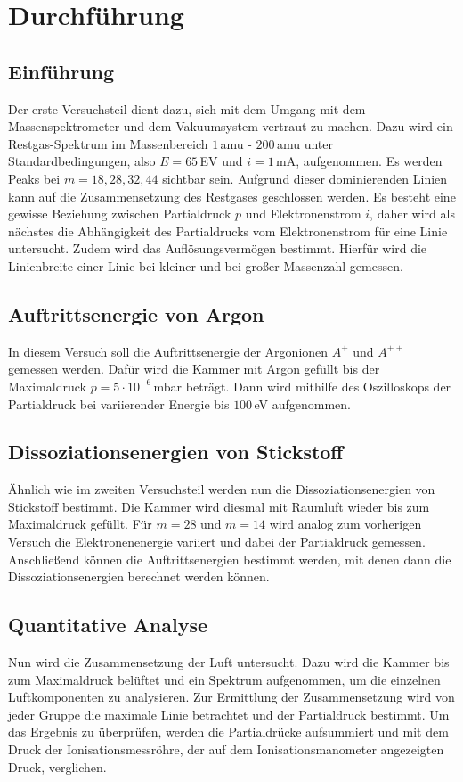 \chapter{Durchführung}
\section{Einführung}
Der erste Versuchsteil dient dazu, sich mit dem Umgang mit dem Massenspektrometer und dem Vakuumsystem vertraut zu machen. Dazu wird ein Restgas-Spektrum im Massenbereich $1\,$amu - $200\,$amu unter Standardbedingungen, also $E=65\,$EV und $i=1\,$mA, aufgenommen. Es werden Peaks bei $m=18, 28, 32, 44$ sichtbar sein. Aufgrund dieser dominierenden Linien kann auf die Zusammensetzung des Restgases geschlossen werden. Es besteht eine gewisse Beziehung zwischen Partialdruck $p$ und Elektronenstrom $i$, daher wird als nächstes die Abhängigkeit des Partialdrucks vom Elektronenstrom für eine Linie untersucht. Zudem wird das Auflösungsvermögen  bestimmt. Hierfür wird die Linienbreite einer Linie bei kleiner und bei großer Massenzahl gemessen. 

\section{Auftrittsenergie von Argon}
In diesem Versuch soll die Auftrittsenergie der Argonionen $A^{+}$ und $A^{++}$ gemessen werden. Dafür wird die Kammer mit Argon gefüllt bis der Maximaldruck $p=5 \cdot 10^{-6}\,$mbar beträgt. Dann wird mithilfe des Oszilloskops der Partialdruck bei variierender Energie bis $100\,$eV aufgenommen.

\section{Dissoziationsenergien von Stickstoff}
Ähnlich wie im zweiten Versuchsteil werden nun die Dissoziationsenergien von Stickstoff bestimmt. Die Kammer wird diesmal mit Raumluft wieder bis zum Maximaldruck gefüllt. Für $m=28$ und $m=14$ wird analog zum vorherigen Versuch die Elektronenenergie variiert und dabei der Partialdruck gemessen. Anschließend können die Auftrittsenergien bestimmt werden, mit denen dann die Dissoziationsenergien berechnet werden können.

\section{Quantitative Analyse}
Nun wird die Zusammensetzung der Luft untersucht. Dazu wird die Kammer bis zum Maximaldruck belüftet und ein Spektrum aufgenommen, um die einzelnen Luftkomponenten zu analysieren. Zur Ermittlung der Zusammensetzung wird von jeder Gruppe die maximale Linie betrachtet und der Partialdruck bestimmt. Um das Ergebnis zu überprüfen, werden die Partialdrücke aufsummiert und mit dem Druck der Ionisationsmessröhre, der auf dem Ionisationsmanometer angezeigten Druck, verglichen. 

